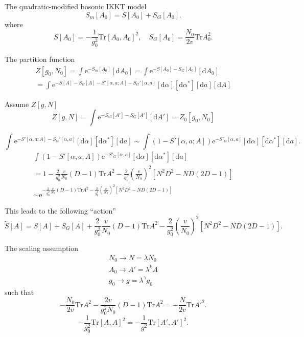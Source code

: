 
The quadratic-modified bosonic IKKT model
\begin{equation}
	S_{m}[A_0] = S[A_0] + S_{G}[A_0].
\end{equation}
where
\[
	S[A_0] = - \frac{1}{g_0^2} \mathrm{Tr} [A_0,A_0]^2,\quad
	S_{G}[A_0] = \frac{N_0}{2 v} \mathrm{Tr} A_0^2
.\] 

The partition function
\begin{align*}
	Z[g_0,N_0] = \int \mathrm{e}^{- S_m[A_0]} [\mathrm{d}A_0]
	= \int \mathrm{e}^{-S[A_0] - S_G[A_0]} [\mathrm{d}A_0]\\
	=\int \mathrm{e}^{-S[A]-S_G[A] - S'[\alpha,a;A]-S_G'[\alpha,a]}
	[\mathrm{d}\alpha] [\mathrm{d}\alpha^*][\mathrm{d}a][\mathrm{d}A]
\end{align*}

Assume $Z[g,N]$
\begin{equation}
	Z[g,N] = \int \mathrm{e}^{- S_{\text{eff}}[A'] - S_G[A']} [\mathrm{d}A']
	= Z_0[g_0,N_0]
\end{equation}

\[
	\int  \mathrm{e}^{-S'[\alpha,a;A]-S_G'[\alpha,a]} [\mathrm{d}\alpha]
	[\mathrm{d}\alpha^* ][\mathrm{d}a]
	\sim
	\int (1 - S'[\alpha,a;A]) \mathrm{e}^{-S'_G[\alpha,a]}
	[\mathrm{d}\alpha][\mathrm{d}\alpha^*][\mathrm{d}a]
.\] 
\begin{align*}
	\int (1 - S'[\alpha,a;A]) \mathrm{e}^{-S'_G[\alpha,a]}
	[\mathrm{d}\alpha][\mathrm{d}\alpha^*][\mathrm{d}a]
	\\=
	1 - \frac{2}{g_0^2} \frac{v}{N_0} (D-1) \mathrm{Tr}A^2
	-\frac{2}{g_0^2} \left( \frac{v}{N_0} \right) ^2
	[N^2D^2-ND(2D-1)]
	\\
	\sim \mathrm{e}^{
	 - \frac{2}{g_0^2} \frac{v}{N_0} (D-1) \mathrm{Tr}A^2
	-\frac{2}{g_0^2} \left( \frac{v}{N_0} \right) ^2
	[N^2D^2-ND(2D-1)]
}
\end{align*}

This leads to the following ``action''
\[
	\tilde{S}[A] = S[A] + S_G[A]
	+ \frac{2}{g_0^2} \frac{v}{N_0} (D-1) \mathrm{Tr}A^2
	- \frac{2}{g_0^2} \left( \frac{v}{N_0} \right) ^2[N^2 D^2 - ND(2D-1)]
.\] 

The scaling assumption
\begin{align*}
	N_0 \to N = \lambda N_0 \\
	A_0 \to A' = \lambda^k A\\
	g_0 \to g = \lambda^\gamma g_0
\end{align*}
such that
\[
- \frac{N_0}{2v} \mathrm{Tr}A^2 - \frac{2v}{g_0^2 N_0}(D-1)\mathrm{Tr}A^2
= - \frac{N}{2v} \mathrm{Tr} A'^2
.\] 
\[
	- \frac{1}{g_0^2} \mathrm{Tr}[A,A]^2
	= - \frac{1}{g^2} \mathrm{Tr} [A',A']^2
.\] 


